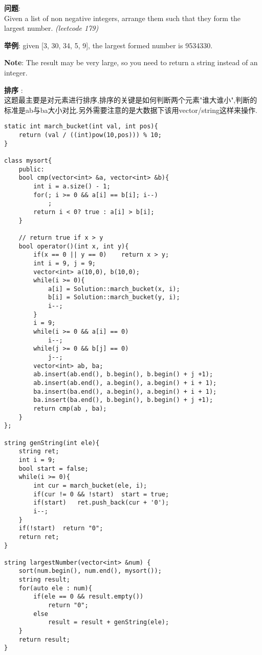     
\begin{description}
    \item{\textbf{问题}}: \\Given a list of non negative integers, arrange them such that they form the largest number. \textit{(leetcode 179)}
	\item{\textbf{举例}}:
given [3, 30, 34, 5, 9], the largest formed number is 9534330.
	\item{\textbf{Note}}:
The result may be very large, so you need to return a string instead of an integer.
    \item{\textbf{排序}} : 
    \\这题最主要是对元素进行排序,排序的关键是如何判断两个元素"谁大谁小",判断的标准是ab与ba大小对比.另外需要注意的是大数据下该用vector/string这样来操作.
    \begin{lstlisting}
static int march_bucket(int val, int pos){
	return (val / ((int)pow(10,pos))) % 10;
}

class mysort{
	public:
	bool cmp(vector<int> &a, vector<int> &b){
		int i = a.size() - 1;
		for(; i >= 0 && a[i] == b[i]; i--)
			;
		return i < 0? true : a[i] > b[i];
	}

	// return true if x > y
	bool operator()(int x, int y){
		if(x == 0 || y == 0)	return x > y;
		int i = 9, j = 9;
		vector<int> a(10,0), b(10,0);
		while(i >= 0){
			a[i] = Solution::march_bucket(x, i);
			b[i] = Solution::march_bucket(y, i);
			i--;
		}
		i = 9;
		while(i >= 0 && a[i] == 0)
			i--;
		while(j >= 0 && b[j] == 0)
			j--;
		vector<int> ab, ba;
		ab.insert(ab.end(), b.begin(), b.begin() + j +1);
		ab.insert(ab.end(), a.begin(), a.begin() + i + 1);
		ba.insert(ba.end(), a.begin(), a.begin() + i + 1);
		ba.insert(ba.end(), b.begin(), b.begin() + j +1);
		return cmp(ab , ba);
	}
};

string genString(int ele){
	string ret;
	int i = 9;
	bool start = false;
	while(i >= 0){
		int cur = march_bucket(ele, i);
		if(cur != 0 && !start)	start = true;
		if(start)	ret.push_back(cur + '0');
		i--;
	}
	if(!start)	return "0";
	return ret;
}

string largestNumber(vector<int> &num) {
	sort(num.begin(), num.end(), mysort());
	string result;
	for(auto ele : num){
		if(ele == 0 && result.empty())
			return "0";
		else
			result = result + genString(ele);
	}
	return result;
}
    \end{lstlisting}
\end{description}
